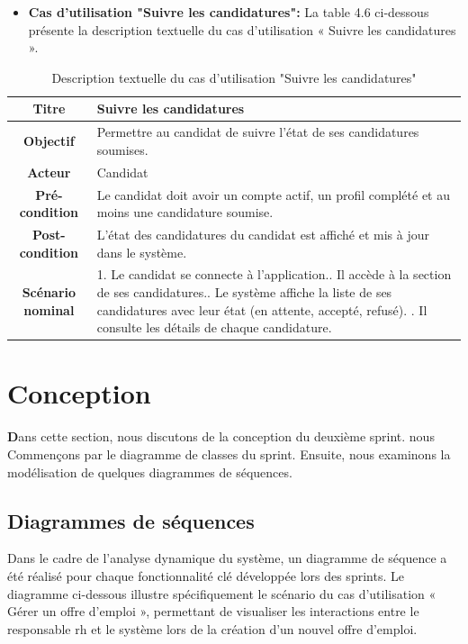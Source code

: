 \begin{itemize}
        \item \textbf{Cas d'utilisation "Suivre les candidatures": } La table 4.6 ci-dessous présente la description textuelle du cas d'utilisation « Suivre les candidatures ».
    \end{itemize}
    \begin{table}[H]
    \caption{ Description textuelle du cas d’utilisation "Suivre les candidatures"}
    \centering
    \begin{tabular}{|c|p{12cm}|}
    \hline
    \textbf{Titre} & Suivre les candidatures \\
    \hline
    \textbf{Objectif} & Permettre au candidat de suivre l’état de ses candidatures soumises. \\
    \hline
    \textbf{Acteur}& Candidat\\
    \hline
    \textbf{Pré-condition} & Le candidat doit avoir un compte actif, un profil complété et au moins une candidature soumise.
    \\
    \hline
    \textbf{Post-condition} & L’état des candidatures du candidat est affiché et mis à jour dans le système.\\
    \hline
    \textbf{Scénario nominal} & 1. Le candidat se connecte à l’application.\newline
    2. Il accède à la section de ses candidatures.\newline
    3. Le système affiche la liste de ses candidatures avec leur état (en attente, accepté, refusé).
    \newline
    4. Il consulte les détails de chaque candidature.\\
    \hline
    \end{tabular}
    \label{tab:user_stories}
\end{table}

\section{Conception}
\hspace{0.5cm}\textbf Dans cette section, nous discutons de la conception du deuxième sprint. nous Commençons par le diagramme de classes du sprint. Ensuite, nous examinons la modélisation de quelques diagrammes de séquences. 



   
\subsection{Diagrammes de séquences}
Dans le cadre de l’analyse dynamique du système, un diagramme de séquence a été réalisé pour chaque fonctionnalité clé développée lors des sprints. Le diagramme ci-dessous illustre spécifiquement le scénario du cas d'utilisation « Gérer un offre d'emploi », permettant de visualiser les interactions entre le responsable rh et le système lors de la création d’un nouvel offre d'emploi.
